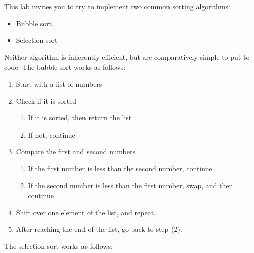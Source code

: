 \documentclass{article}
\begin{document}
This lab invites you to try to implement two common sorting algorithms:

\begin{itemize}
\itemsep1pt\parskip0pt
\item
  Bubble sort,
\item
  Selection sort
\end{itemize}

Neither algorithm is inherently efficient, but are comparatively simple
to put to code. The bubble sort works as follows:

\begin{enumerate}
\def\labelenumi{\arabic{enumi}.}
\itemsep1pt\parskip0pt
\item
  Start with a list of numbers
\item
  Check if it is sorted

  \begin{enumerate}
  \def\labelenumii{\arabic{enumii}.}
  \itemsep1pt\parskip0pt
  \item
    If it is sorted, then return the list
  \item
    If not, continue
  \end{enumerate}
\item
  Compare the first and second numbers

  \begin{enumerate}
  \def\labelenumii{\arabic{enumii}.}
  \itemsep1pt\parskip0pt
  \item
    If the first number is less than the second number, continue
  \item
    If the second number is less than the first number, swap, and then
    continue
  \end{enumerate}
\item
  Shift over one element of the list, and repeat.
\item
  After reaching the end of the list, go back to step (2).
\end{enumerate}

The selection sort works as follows:
\end{document}
